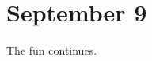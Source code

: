 \documentclass[../notes.tex]{subfiles}
\begin{document}
\section{September 9}

The fun continues.
\end{document}
